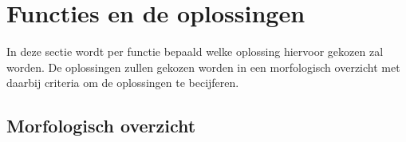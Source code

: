 \section{Functies en de oplossingen}

In deze sectie wordt per functie bepaald welke oplossing hiervoor gekozen zal worden. De oplossingen zullen gekozen worden in een morfologisch overzicht met daarbij criteria om de oplossingen te becijferen.

\subsection{Morfologisch overzicht}

